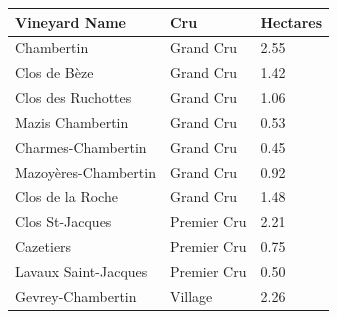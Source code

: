 \documentclass{article}
\begin{document}
\begin{tabular}{lll}
\toprule
Vineyard Name & Cru & Hectares \\
\midrule
Chambertin & Grand Cru & 2.55 \\
Clos de Bèze & Grand Cru & 1.42 \\
Clos des Ruchottes & Grand Cru & 1.06 \\
Mazis Chambertin & Grand Cru & 0.53 \\
Charmes-Chambertin & Grand Cru & 0.45 \\
Mazoyères-Chambertin & Grand Cru & 0.92 \\
Clos de la Roche & Grand Cru & 1.48 \\
Clos St-Jacques & Premier Cru & 2.21 \\
Cazetiers & Premier Cru & 0.75 \\
Lavaux Saint-Jacques & Premier Cru & 0.50 \\
Gevrey-Chambertin & Village & 2.26 \\
\bottomrule
\end{tabular}
\end{document}
